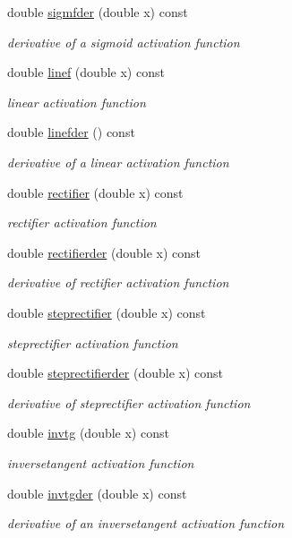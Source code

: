 \begin{DoxyCompactItemize}
double \hyperlink{classActivation_a4464adcd12fb089af4341e136c7884b3}{sigmfder} (double x) const 
\begin{DoxyCompactList}\small\item\em derivative of a sigmoid activation function \end{DoxyCompactList}\item 
double \hyperlink{classActivation_ad226ba33b77633d0c6f7135a31bcc655}{linef} (double x) const 
\begin{DoxyCompactList}\small\item\em linear activation function \end{DoxyCompactList}\item 
double \hyperlink{classActivation_af3c02c76ebc566d579dc92ec84c93a87}{linefder} () const 
\begin{DoxyCompactList}\small\item\em derivative of a linear activation function \end{DoxyCompactList}\item 
double \hyperlink{classActivation_ad41af90f5c776edda91437f16d449598}{rectifier} (double x) const 
\begin{DoxyCompactList}\small\item\em rectifier activation function \end{DoxyCompactList}\item 
double \hyperlink{classActivation_ae57f9f782c48b9704e000dcb5237658b}{rectifierder} (double x) const 
\begin{DoxyCompactList}\small\item\em derivative of rectifier activation function \end{DoxyCompactList}\item 
double \hyperlink{classActivation_a2148835f7651b4d057c8bf33389293f2}{steprectifier} (double x) const 
\begin{DoxyCompactList}\small\item\em steprectifier activation function \end{DoxyCompactList}\item 
double \hyperlink{classActivation_a0a0400c04a72f3e5b22750ca6f93c793}{steprectifierder} (double x) const 
\begin{DoxyCompactList}\small\item\em derivative of steprectifier activation function \end{DoxyCompactList}\item 
double \hyperlink{classActivation_a5709cafbe5391c32b76f6816ad506d2c}{invtg} (double x) const 
\begin{DoxyCompactList}\small\item\em inversetangent activation function \end{DoxyCompactList}\item 
double \hyperlink{classActivation_a7b8967b6b29b76e67c567ddf9498da4c}{invtgder} (double x) const 
\begin{DoxyCompactList}\small\item\em derivative of an inversetangent activation function \end{DoxyCompactList}\end{DoxyCompactItemize}


